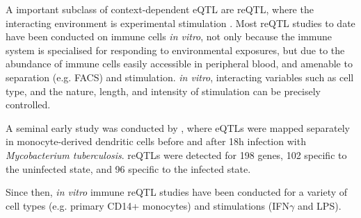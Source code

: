 \begin{outline}
\1 A important subclass of context-dependent \gls{eQTL} are \gls{reQTL}, where the interacting environment is experimental stimulation \autocite{vandiedonck2017GeneticAssociationMolecular,huang2019GeneticsGeneExpression}.
Most \gls{reQTL} studies to date have been conducted on immune cells \textit{in vitro}, 
not only because the immune system is specialised for responding to environmental exposures,
but due to the abundance of immune cells easily accessible in peripheral blood,
and amenable to separation (e.g. FACS) and stimulation.
\textit{in vitro}, interacting variables such as cell type, and the nature, length, and intensity of stimulation can be precisely controlled.

\1 A seminal early study was conducted by \autocite{barreiro2012DecipheringGeneticArchitecture}, where eQTLs were mapped separately in monocyte-derived dendritic cells before and after 18h infection with \textit{Mycobacterium tuberculosis}.
    \2 reQTLs were detected for 198 genes, 102 specific to the uninfected state, and 96 specific to the infected state. 

    \2 Since then, \textit{in vitro} immune reQTL studies have been conducted for a variety of 
    cell types
        (e.g. primary CD14+ monocytes\autocite{fairfax2014InnateImmuneActivity}) 
    and stimulations 
    (IFN$\gamma$ and LPS\autocite{fairfax2014InnateImmuneActivity}).



\end{outline}
